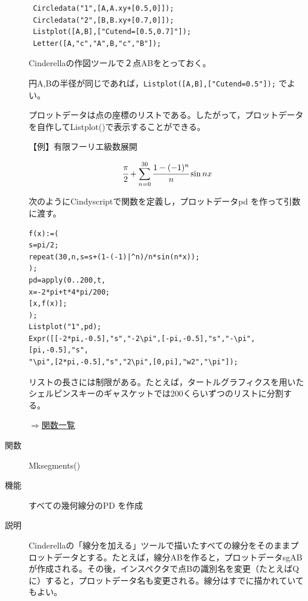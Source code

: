 \documentclass[papersize,a4paper,12pt,uplatex]{jsarticle}
\begin{document}
\begin{description}
\begin{verbatim}
 Circledata("1",[A,A.xy+[0.5,0]]);
 Circledata("2",[B,B.xy+[0.7,0]]);
 Listplot([A,B],["Cutend=[0.5,0.7]"]);
 Letter([A,"c","A",B,"c","B"]);
\end{verbatim}
Cinderellaの作図ツールで２点ABをとっておく。

円A,Bの半径が同じであれば，\verb|Listplot([A,B],["Cutend=0.5"]);| でよい。

\vspace{\baselineskip}
プロットデータは点の座標のリストである。したがって，プロットデータを自作してListplot()で表示することができる。

\vspace{\baselineskip}
【例】有限フーリエ級数展開

 \[\cfrac{\pi}{2}+\sum_{n=0}^{30} \cfrac{1-(-1)^n}{n}\sin nx\]

次のようにCindyscriptで関数を定義し，プロットデータpd を作って引数に渡す。
\begin{verbatim}
f(x):=(
s=pi/2;
repeat(30,n,s=s+(1-(-1)|^n)/n*sin(n*x));
);
pd=apply(0..200,t,
x=-2*pi+t*4*pi/200;
[x,f(x)];
);
Listplot("1",pd);
Expr([[-2*pi,-0.5],"s","-2\pi",[-pi,-0.5],"s","-\pi",[pi,-0.5],"s",
"\pi",[2*pi,-0.5],"s","2\pi",[0,pi],"w2","\pi"]);
\end{verbatim}

\vspace{\baselineskip}
\hspace{20mm}

\vspace{\baselineskip}
 リストの長さには制限がある。たとえば，タートルグラフィクスを用いたシェルピンスキーのギャスケットでは200くらいずつのリストに分割する。
 
 \hspace{20mm}\scalebox{0.8}{ }
\begin{flushright}\hyperlink{functionlist}{$\Rightarrow$関数一覧}\end{flushright}

\vspace{\baselineskip}
\hypertarget{mksegments}{}
\item[関数]Mksegments()
\item[機能]すべての幾何線分のPD を作成
\item[説明]Cinderellaの「線分を加える」ツールで描いたすべての線分をそのままプロットデータとする。たとえば，線分ABを作ると，プロットデータsgABが作成される。その後，インスペクタで点Bの識別名を変更（たとえばQに）すると，プロットデータ名も変更される。線分はすでに描かれていてもよい。


\end{description}
\end{document}
